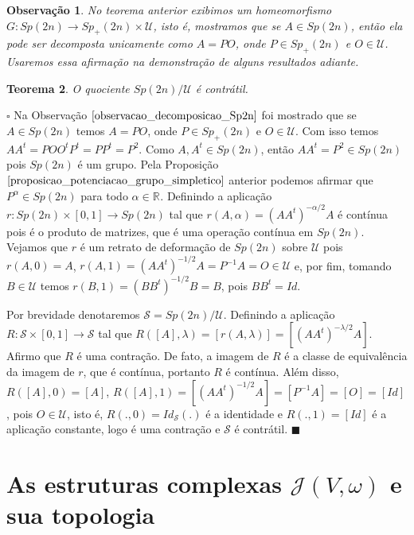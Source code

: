 \documentclass[12pt]{book}
\newtheorem{teorema}{Teorema}[section]
\newtheorem{observacao}[teorema]{Observação}
\newenvironment{prova}[1]{$\square$ #1}{\hfill$\blacksquare$}
\newcommand{\estruturascomplexaspadrao}{\mathcal{J}(V, \omega)}
\newcommand{\gruposimpletico}[1]{Sp(#1)}
\newcommand{\gruposimpleticopositivo}[1]{Sp_{+}(#1)}
\newcommand{\real}[1]{\mathbb{R}^{#1}}
\begin{document}
	\begin{observacao}\label{observacao_decomposicao_Sp2n}
		No teorema anterior exibimos um homeomorfismo $G:\gruposimpletico{2n} \to \gruposimpleticopositivo{2n} \times \mathcal{U}$, isto é, mostramos que se $A \in \gruposimpletico{2n}$, então ela pode ser decomposta unicamente como $A=PO$, onde $P\in \gruposimpleticopositivo{2n}$ e $O \in \mathcal{U}$. Usaremos essa afirmação na demonstração de alguns resultados adiante.
	\end{observacao}
	
	\begin{teorema}
		O quociente $\gruposimpletico{2n}/\mathcal{U}$ é contrátil.
	\end{teorema}
	\begin{prova}
		Na Observação $\ref{observacao_decomposicao_Sp2n}$ foi mostrado que se $A \in \gruposimpletico{2n}$ temos $A=PO$, onde $P \in \gruposimpleticopositivo{2n}$ e $O \in \mathcal{U}$. Com isso temos $AA^{t} = POO^{t}P^{t} = PP^{t}=P^{2}$. Como $A,A^{t} \in \gruposimpletico{2n}$, então $AA^{t} =P^{2} \in \gruposimpletico{2n}$ pois $\gruposimpletico{2n}$ é um grupo. Pela Proposição $\ref{proposicao_potenciacao_grupo_simpletico}$ anterior podemos afirmar que $P^{\alpha} \in \gruposimpletico{2n}$ para todo $\alpha \in \real{}$. Definindo a aplicação $r:\gruposimpletico{2n}\times [0,1] \to \gruposimpletico{2n}$ tal que $r(A, \alpha) = (AA^{t})^{-\alpha/2}A$ é contínua pois é o produto de matrizes, que é uma operação contínua em $\gruposimpletico{2n}$. Vejamos que $r$ é um retrato de deformação de $\gruposimpletico{2n}$ sobre $\mathcal{U}$ pois $r(A, 0) = A$, $r(A, 1) = (AA^{t})^{-1/2}A = P^{-1}A = O \in \mathcal{U}$ e, por fim, tomando $B \in \mathcal{U}$ temos $r(B, 1) = (BB^{t})^{-1/2}B = B$, pois $BB^{t} = Id$.
		
		Por brevidade denotaremos $\mathcal{S} = \gruposimpletico{2n}/\mathcal{U}$. Definindo a aplicação $R:\mathcal{S} \times [0,1] \to \mathcal{S}$ tal que $R([A], \lambda) = [r(A, \lambda)] = [(AA^{t})^{-\lambda/2}A]$. Afirmo que $R$ é uma contração. De fato, a imagem de $R$ é a classe de equivalência da imagem de $r$, que é contínua, portanto $R$ é contínua. Além disso, $R([A], 0) = [A]$, $R([A], 1) = [(AA^{t})^{-1/2}A] = [P^{-1}A] = [O] = [Id]$, pois $O \in \mathcal{U}$, isto é, $R(., 0) = Id_{\mathcal{S}}(.)$ é a identidade e $R(., 1) = [Id]$ é a aplicação constante, logo é uma contração e $\mathcal{S}$ é contrátil.
	\end{prova}
	
	\section{As estruturas complexas $\estruturascomplexaspadrao$ e sua topologia}
	
\end{document}
